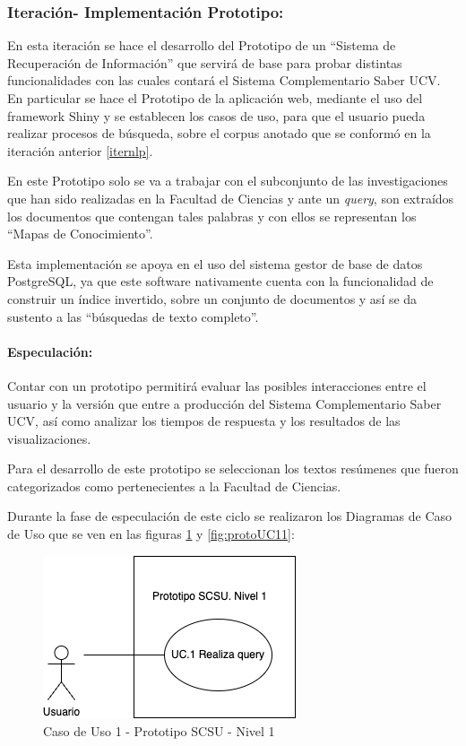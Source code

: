 \documentclass[
  12pt,
  openany]{book}
\begin{document}
\hypertarget{iterbol}{%
\subsubsection{Iteración- Implementación Prototipo:}\label{iterbol}}

En esta iteración se hace el desarrollo del Prototipo de un ``Sistema de Recuperación de Información'' que servirá de base para probar distintas funcionalidades con las cuales contará el Sistema Complementario Saber UCV. En particular se hace el Prototipo de la aplicación web, mediante el uso del framework Shiny y se establecen los casos de uso, para que el usuario pueda realizar procesos de búsqueda, sobre el corpus anotado que se conformó en la iteración anterior \ref{iternlp}.

En este Prototipo solo se va a trabajar con el subconjunto de las investigaciones que han sido realizadas en la Facultad de Ciencias y ante un \emph{query}, son extraídos los documentos que contengan tales palabras y con ellos se representan los ``Mapas de Conocimiento''.

Esta implementación se apoya en el uso del sistema gestor de base de datos PostgreSQL, ya que este software nativamente cuenta con la funcionalidad de construir un índice invertido, sobre un conjunto de documentos y así se da sustento a las ``búsquedas de texto completo''.

\hypertarget{especulaciuxf3n-6}{%
\paragraph{Especulación:}\label{especulaciuxf3n-6}}

Contar con un prototipo permitirá evaluar las posibles interacciones entre el usuario y la versión que entre a producción del Sistema Complementario Saber UCV, así como analizar los tiempos de respuesta y los resultados de las visualizaciones.

Para el desarrollo de este prototipo se seleccionan los textos resúmenes que fueron categorizados como pertenecientes a la Facultad de Ciencias.

Durante la fase de especulación de este ciclo se realizaron los Diagramas de Caso de Uso que se ven en las figuras \ref{fig:protoUC1} y \ref{fig:protoUC11}:

\newpage

\begin{figure}

{\centering \includegraphics[width=0.45\linewidth]{images/05-desarrollo/2_ciclo/UC/prototipo_nivel1} 

}

\caption{Caso de Uso 1 - Prototipo SCSU - Nivel 1}\label{fig:protoUC1}
\end{figure}
\end{document}
